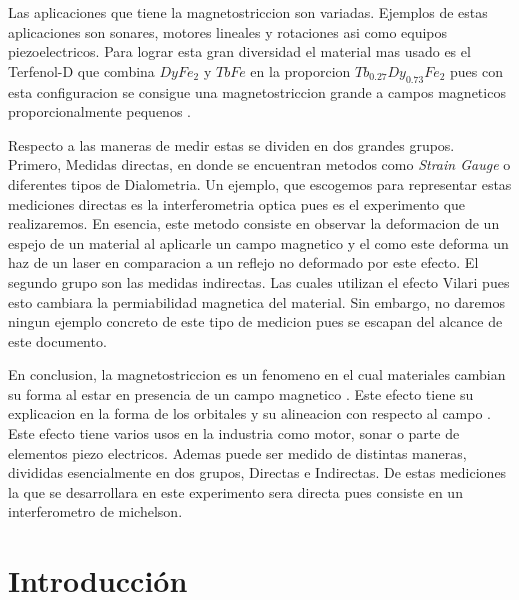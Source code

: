 \documentclass[a4paper, amsfonts, amssymb, amsmath, reprint, showkeys, nofootinbib, twoside]{revtex4-1}
\begin{document}
Las aplicaciones que tiene la magnetostriccion son variadas. Ejemplos de estas aplicaciones son sonares, motores lineales y rotaciones asi como equipos piezoelectricos\cite{Ekreem_2007}. Para lograr esta gran diversidad el material mas usado es el Terfenol-D que combina $DyFe_2$ y $TbFe$ en la proporcion $Tb_{0.27}Dy_{0.73}Fe_2$ pues con esta configuracion se consigue una magnetostriccion grande a campos magneticos proporcionalmente pequenos \cite{Piercy_1997}.

Respecto a las maneras de medir estas se dividen en dos grandes grupos. Primero, Medidas directas, en donde se encuentran metodos como \textit{Strain Gauge} o diferentes tipos de Dialometria\cite{Ekreem_2007}. Un ejemplo, que escogemos para representar estas mediciones directas es la interferometria optica pues es el experimento que realizaremos. En esencia, este metodo consiste en observar la deformacion de un espejo de un material al aplicarle un campo magnetico y el como este deforma un haz de un laser en comparacion a un reflejo no deformado por este efecto. El segundo grupo son las medidas indirectas. Las cuales utilizan el efecto Vilari pues esto cambiara la permiabilidad magnetica del material\cite{Ekreem_2007}. Sin embargo, no daremos ningun ejemplo concreto de este tipo de medicion pues se escapan del alcance de este documento.

En conclusion, la magnetostriccion es un fenomeno en el cual materiales cambian su forma al estar en presencia de un campo magnetico \cite{Ekreem_2007}. Este efecto tiene su explicacion en la forma de los orbitales y su alineacion con respecto al campo \cite{Ekreem_2007}. Este efecto tiene varios usos en la industria como motor, sonar o parte de elementos piezo electricos. Ademas puede ser medido de distintas maneras, divididas esencialmente en dos grupos, Directas e Indirectas. De estas mediciones la que se desarrollara en este experimento sera directa pues consiste en un interferometro de michelson.

\section{Introducción}
\end{document}
